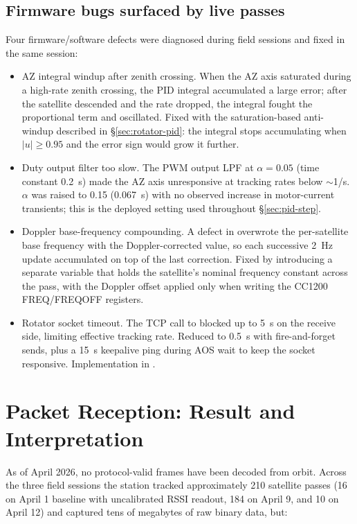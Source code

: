 \subsection{Firmware bugs surfaced by live passes}

Four firmware/software defects were diagnosed during field sessions and fixed in the same session:

\begin{itemize}
    \item AZ integral windup after zenith crossing. When the AZ axis saturated during a high-rate zenith crossing, the PID integral accumulated a large error; after the satellite descended and the rate dropped, the integral fought the proportional term and oscillated. Fixed with the saturation-based anti-windup described in \S\ref{sec:rotator-pid}: the integral stops accumulating when $|u| \geq 0.95$ and the error sign would grow it further.
    \item Duty output filter too slow. The PWM output LPF at $\alpha = 0.05$ (time constant 0.2~s) made the AZ axis unresponsive at tracking rates below $\sim$1\degree/s. $\alpha$ was raised to 0.15 (0.067~s) with no observed increase in motor-current transients; this is the deployed setting used throughout \S\ref{sec:pid-step}.
    \item Doppler base-frequency compounding. A defect in  overwrote the per-satellite base frequency with the Doppler-corrected value, so each successive 2~Hz update accumulated on top of the last correction. Fixed by introducing a separate  variable that holds the satellite's nominal frequency constant across the pass, with the Doppler offset applied only when writing the CC1200 FREQ/FREQOFF registers.
    \item Rotator socket timeout. The TCP  call to  blocked up to 5~s on the receive side, limiting effective tracking rate. Reduced to 0.5~s with fire-and-forget sends, plus a 15~s keepalive ping during AOS wait to keep the socket responsive. Implementation in .
\end{itemize}

\section{Packet Reception: Result and Interpretation}
\label{sec:packet-reception}

As of April 2026, no protocol-valid frames have been decoded from orbit. Across the three field sessions the station tracked approximately 210 satellite passes (16 on April 1 baseline with uncalibrated RSSI readout, 184 on April 9, and 10 on April 12) and captured tens of megabytes of raw binary data, but:

